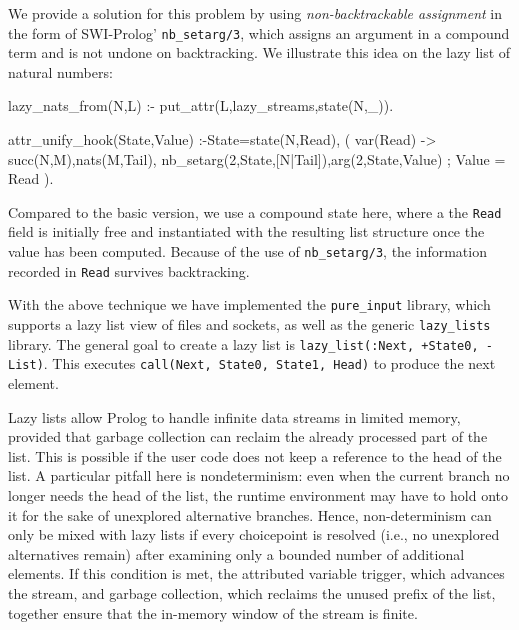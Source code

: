 \documentclass[submission,copyright,creativecommons]{eptcs}
\begin{document}
We provide a solution for this problem by using \emph{non-backtrackable
assignment} in the form of SWI-Prolog' \texttt{nb\_setarg/3}, which assigns an
argument in a compound term and is not undone on backtracking. We illustrate this
idea on the lazy list of natural numbers:
\begin{code}
lazy_nats_from(N,L) :- put_attr(L,lazy_streams,state(N,_)).

attr_unify_hook(State,Value) :-State=state(N,Read),
  ( var(Read) -> succ(N,M),nats(M,Tail),
     nb_setarg(2,State,[N|Tail]),arg(2,State,Value)
  ;  Value = Read
  ).
\end{code}
Compared to the basic version, we use a compound state here, where a
the \texttt{Read} field is initially free 
and instantiated with the resulting list structure once the value has been computed. Because
of the use of {\tt nb\_setarg/3}, the information recorded in \texttt{Read}
survives backtracking.

With the above technique we have implemented the \texttt{pure\_input} library, which supports a lazy list view of files and sockets, 
as well as the generic
\texttt{lazy\_lists}
library. The general goal to create a lazy list is
\texttt{lazy\_list(:Next, +State0, -List)}. This executes
\texttt{call(Next, State0, State1, Head)} to produce the next element.

Lazy lists allow Prolog to handle infinite data streams in limited memory,
provided that garbage collection can reclaim the already processed part of the
list. This is possible if the user code does not keep a reference to the head
of the list. A particular pitfall here is nondeterminism: even when the current
branch no longer needs the head of the list, the runtime environment may have
to hold onto it for the sake of unexplored alternative branches.
Hence, non-determinism can only be mixed with lazy lists if every choicepoint
is resolved (i.e., no unexplored alternatives remain) after examining only a bounded number of additional elements. 
If this condition is met, 
the attributed variable trigger, which advances the stream, and garbage
collection, which reclaims the unused prefix of the list, together
ensure that the in-memory window of the stream is finite. 


% 
\end{document}

